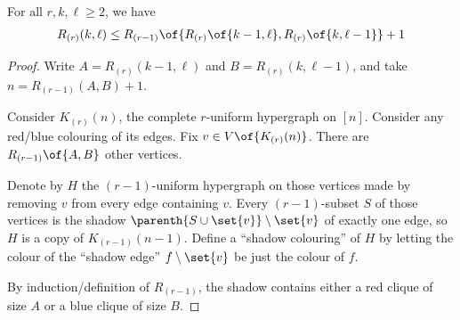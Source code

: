 \begin{boxtheorem} \label{Ch2:Thm:Hypergraph_Ramsey_Recursion}
    For all $r, k, \ell \geq 2$, we have
    \begin{align*}
        R_{(r)}(k, \ell) \le R_{(r - 1)}\of{R_{(r)}\of{k - 1, \ell}, R_{(r)}\of{k, \ell - 1}} + 1
    \end{align*}
\end{boxtheorem}
\begin{proof}
    Write $A = R_{(r)}(k - 1, \ell)$ and $B = R_{(r)}(k, \ell - 1)$, and take $n = R_{(r - 1)}(A, B) + 1$.

    Consider $K_{(r)}(n)$, the complete $r$-uniform hypergraph on $[n]$. Consider any red/blue colouring of its edges. Fix $v \in V\of{K_{(r)}(n)}$. There are $R_{(r - 1)}\of{A, B}$ other vertices.

    Denote by $H$ the $(r - 1)$-uniform hypergraph on those vertices made by removing $v$ from every edge containing $v$. Every $(r - 1)$-subset $S$ of those vertices is the shadow $\parenth{S \cup \set{v}} \setminus \set{v}$ of exactly one edge, so $H$ is a copy of $K_{(r - 1)}(n - 1)$. Define a ``shadow colouring'' of $H$ by letting the colour of the ``shadow edge'' $f \setminus \set{v}$ be just the colour of $f$.

    By induction/definition of $R_{(r - 1)}$, the shadow contains either a red clique of size $A$ or a blue clique of size $B$.


\end{proof}
